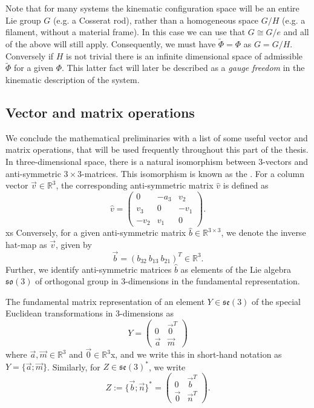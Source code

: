 Note that for many systems the kinematic configuration space will be an entire Lie group $G$ (e.g. a Cosserat rod), rather than a homogeneous space $G/H$ (e.g. a filament, without a material frame). In this case we can use that $G \cong G / e$ and all of the above will still apply. Consequently, we must have $\tilde{\Phi} = \Phi$ as $G = G/H$. Conversely if $H$ is not trivial there is an infinite dimensional space of admissible $\tilde{\Phi}$ for a given $\Phi$. This latter fact will later be described as a \textit{gauge freedom} in the kinematic description of the system.

\subsection{Vector and matrix operations}

We conclude the mathematical preliminaries with a list of some useful vector and matrix operations, that will be used frequently throughout this part of the thesis.  In three-dimensional space, there is a natural isomorphism between $3$-vectors and anti-symmetric $3 \times 3$-matrices. This isomorphism is known as the . For a column vector $\vec{v} \in \mathbb{R}^3$, the corresponding anti-symmetric matrix $\hat{v}$ is defined as
\begin{equation} \label{eq:hat map}
\hat{v} =  \begin{pmatrix}
0 & -a_3 & v_2 \\
v_3 & 0 & - v_1 \\
- v_2 & v_1 & 0
\end{pmatrix}.
\end{equation}xs
Conversely, for a given anti-symmetric matrix $\hat{b} \in \mathbb{R}^{3 \times 3}$, we denote the inverse hat-map as $\vec{v}$, given by
\begin{equation}
	\vec{b} = (b_{32}\ b_{13}\ b_{21})^T \in \mathbb{R}^3.
\end{equation}
Further, we identify anti-symmetric matrices $\hat{b}$ as elements of the Lie algebra $\mathfrak{so}(3)$ of orthogonal group in $3$-dimensions in the fundamental representation.

The fundamental matrix representation of an element $Y \in \mathfrak{se}(3)$ of the special Euclidean transformations in $3$-dimensions as
\begin{equation}
	Y = \begin{pmatrix}
		0 & \vec{0}^T \\
		\vec{a} & \vec{m}
	\end{pmatrix}
\end{equation}
where $\vec{a}, \vec{m} \in \mathbb{R}^3$ and $\vec{0} \in \mathbb{R}^3$x, and we write this in short-hand notation as $Y = \{ \vec{a} ; \vec{m} \}$. Similarly, for $Z \in \mathfrak{se}(3)^*$, we write
\begin{equation}
	Z := \{ \vec{b} ; \vec{n} \}^* = \begin{pmatrix}
		0 & \vec{b}^T \\
		\vec{0} & \vec{n}^T
	\end{pmatrix}.
\end{equation}


